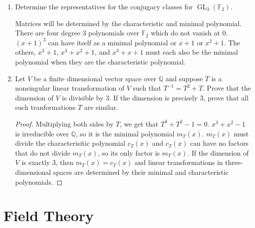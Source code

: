 \documentclass{report}
\newcommand{\Q}{\mathbb{Q}}
\newcommand{\F}{\mathbb{F}}
\DeclareMathOperator{\GL}{GL}
\begin{document}
\begin{enumerate}
\begin{proof}
\begin{enumerate} [label=(\roman*)]
			\end{enumerate}
		\end{proof}
		
		\setcounter{enumi}{16}
	\item Determine the representatives for the conjugacy classes for $\GL_3(\F_2)$.
		\newline

		Matrices will be determined by the characteristic and minimal polynomial. 
		There are four degree $3$ polynomials over $\F_2$ which do not vanish at $0$. $(x+1)^3$ can have itself as a minimal polynomial or $x+1$ or $x^2+1$. 
		The others, $x^3+1$, $x^3+x^2+1$, and $x^3+x+1$ must each also be the minimal polynomial when they are the characteristic polynomial.
	\item Let $V$ be a finite dimensional vector space over $\Q$ and suppose $T$ is a nonsingular linear transformation of $V$ such that $T^{-1}=T^2+T$.
		Prove that the dimension of $V$ is divisible by $3$. If the dimension is precisely $3$, prove that all such tranformations $T$ are similar.
		\begin{proof}
			Multiplying both sides by $T$, we get that $T^3+T^2-1=0$. $x^3+x^2-1$ is irreducible over $\Q$, so it is the minimal polynomial $m_T(x)$.
			$m_T(x)$ must divide the characterisitic polynomial $c_T(x)$ and $c_T(x)$ can have no factors that do not divide $m_T(x)$, so its only factor is $m_T(x)$.
			If the dimension of $V$ is exactly $3$, then $m_T(x)=c_T(x)$ and linear transformations in three-dimensional spaces are determined by their minimal and characteristic polynomials.
		\end{proof}
		
\end{enumerate}

\chapter{Field Theory}
\end{document}
